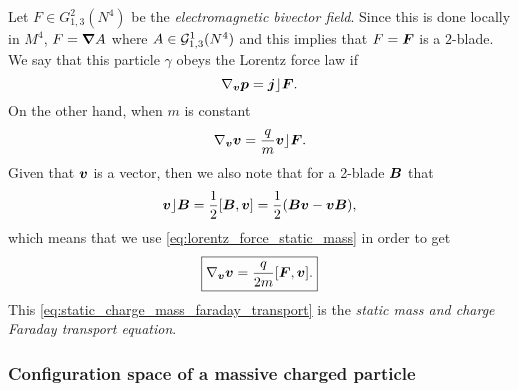 \documentclass[conf]{new-aiaa}
\begin{document}
Let $F\in G_{1,3}^2(N^4)$ be the \emph{electromagnetic bivector field}. Since this is done locally in $M^4$, $F=\boldsymbol{\nabla} A$ where $A\in \mathcal{G}_{1,3}^1(N^4)$ and this implies that $F=\boldsymbol{F}$ is a $2$-blade. We say that this particle $\gamma$ obeys the Lorentz force law if 
\begin{equation}
    \label{eq:lorentz_force_geometric_algebra}
    \nabla_{\boldsymbol{v}} \boldsymbol{p} = \boldsymbol{j}\rfloor \boldsymbol{F}.
\end{equation}
 On the other hand, when $m$ is constant
\begin{equation}
    \label{eq:lorentz_force_static_mass}
    \nabla_{\boldsymbol{v}} \boldsymbol{v} = \frac{q}{m} \boldsymbol{v} \rfloor \boldsymbol{F}.
\end{equation}
Given that $\boldsymbol{v}$ is a vector, then we also note that for a 2-blade $\boldsymbol{B}$ that
\begin{equation}
    \boldsymbol{v} \rfloor \boldsymbol{B} = \frac{1}{2}[\boldsymbol{B},\boldsymbol{v}] = \frac{1}{2}(\boldsymbol{B}\boldsymbol{v} - \boldsymbol{v}\boldsymbol{B}),
\end{equation}
which means that we use \cref{eq:lorentz_force_static_mass} in order to get
\begin{equation}
    \label{eq:static_charge_mass_faraday_transport}
    \boxed{\nabla_{\boldsymbol{v}} \boldsymbol{v} = \frac{q}{2m} [\boldsymbol{F},\boldsymbol{v}].}
\end{equation}
This \cref{eq:static_charge_mass_faraday_transport} is the \emph{static mass and charge Faraday transport equation}.

\subsubsection{Configuration space of a massive charged particle}
\end{document}
